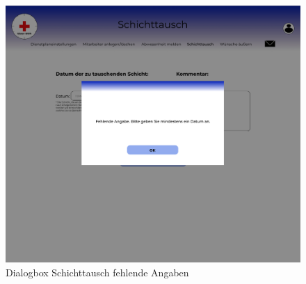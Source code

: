 \documentclass[11pt,
paper=a4,
bibtotocnumbered,	  %
liststotocnumbered,  %
DIV=calc,		  %
tablecaptionabove,	  %
headinclude,
]{article}
\begin{document}
\begin{figure}[H]
\includegraphics[width=1\textwidth]{Bilder/Screens/Schichttausch-2.jpg}{\centering}
\caption{Dialogbox Schichttausch fehlende Angaben}
\end{figure}
\end{document}
